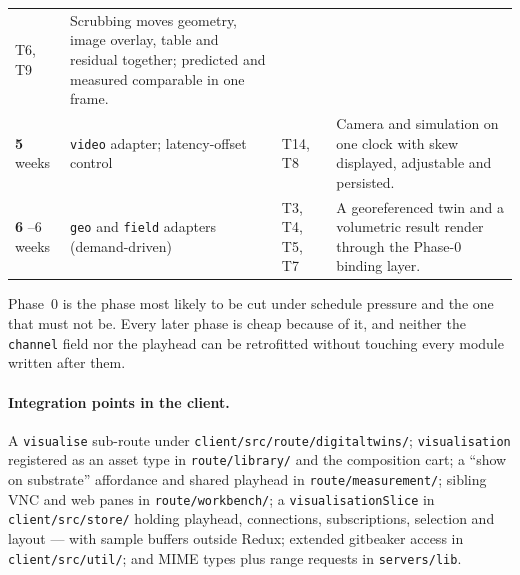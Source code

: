 \begin{longtable}{@{}L{1.9cm}L{4.6cm}L{1.9cm}L{6.4cm}@{}}
T6, T9 & Scrubbing moves geometry, image overlay, table and residual together;
predicted and measured comparable in one frame. \\
\addlinespace
\textbf{5}  weeks & \texttt{video} adapter; latency-offset control & T14, T8 &
Camera and simulation on one clock with skew displayed, adjustable and persisted. \\
\addlinespace
\textbf{6} --6 weeks & \texttt{geo} and \texttt{field} adapters
(demand-driven) & T3, T4, T5, T7 & A georeferenced twin and a volumetric result render
through the Phase-0 binding layer. \\
\bottomrule
\end{longtable}

\begin{keypoint}
Phase~0 is the phase most likely to be cut under schedule pressure and the one that must
not be. Every later phase is cheap because of it, and neither the \texttt{channel} field
nor the playhead can be retrofitted without touching every module written after them.
\end{keypoint}

\paragraph{Integration points in the client.} A \texttt{visualise} sub-route under
\texttt{client/src/route/digitaltwins/}; \texttt{visualisation} registered as an asset
type in \texttt{route/library/} and the composition cart; a ``show on substrate''
affordance and shared playhead in \texttt{route/measurement/}; sibling VNC and web panes
in \texttt{route/workbench/}; a \texttt{visualisationSlice} in \texttt{client/src/store/}
holding playhead, connections, subscriptions, selection and layout --- with sample
buffers outside Redux; extended gitbeaker access in \texttt{client/src/util/}; and MIME
types plus range requests in \texttt{servers/lib}.

